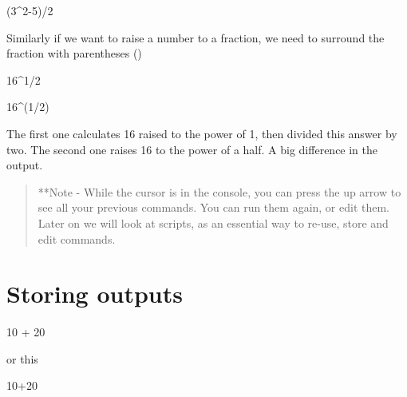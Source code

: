 \documentclass[
]{book}
\newenvironment{Shaded}{\begin{snugshade}}{\end{snugshade}}
\newcommand{\DecValTok}[1]{\textcolor[rgb]{0.00,0.00,0.81}{#1}}
\newcommand{\NormalTok}[1]{#1}
\newcommand{\SpecialCharTok}[1]{\textcolor[rgb]{0.00,0.00,0.00}{#1}}
\begin{document}
\begin{Shaded}
\begin{Highlighting}[]
\NormalTok{(}\DecValTok{3}\SpecialCharTok{\^{}}\DecValTok{2{-}5}\NormalTok{)}\SpecialCharTok{/}\DecValTok{2}
\end{Highlighting}
\end{Shaded}

Similarly if we want to raise a number to a fraction, we need to surround the fraction with parentheses ()

\begin{Shaded}
\begin{Highlighting}[]
\DecValTok{16}\SpecialCharTok{\^{}}\DecValTok{1}\SpecialCharTok{/}\DecValTok{2}
\end{Highlighting}
\end{Shaded}

\begin{Shaded}
\begin{Highlighting}[]
\DecValTok{16}\SpecialCharTok{\^{}}\NormalTok{(}\DecValTok{1}\SpecialCharTok{/}\DecValTok{2}\NormalTok{)}
\end{Highlighting}
\end{Shaded}

The first one calculates 16 raised to the power of 1, then divided this answer by two. The second one raises 16 to the power of a half. A big difference in the output.

\begin{quote}
**Note - While the cursor is in the console, you can press the up arrow to see all your previous commands.
You can run them again, or edit them. Later on we will look at scripts, as an essential way to re-use, store and edit commands.
\end{quote}

\hypertarget{storing-outputs}{%
\section{Storing outputs}\label{storing-outputs}}

\begin{Shaded}
\begin{Highlighting}[]
\DecValTok{10}    \SpecialCharTok{+} \DecValTok{20}
\end{Highlighting}
\end{Shaded}

or this

\begin{Shaded}
\begin{Highlighting}[]
\DecValTok{10}\SpecialCharTok{+}\DecValTok{20}
\end{Highlighting}
\end{Shaded}
\end{document}
